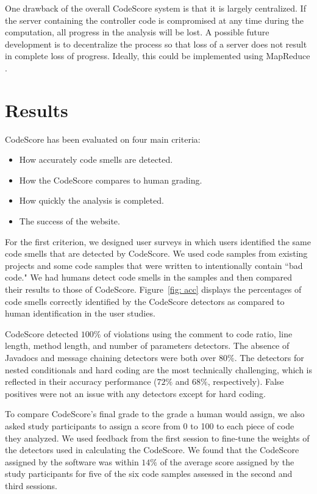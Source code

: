 \documentclass{sig-alternate}
\begin{document}
One drawback of the overall CodeScore system is that it is largely centralized.
If the server containing the controller code is compromised at any time during
the computation, all progress in the analysis will be lost. A possible future development
is to decentralize the process so that loss of a server does
not result in complete loss of progress. Ideally, this could be implemented
using MapReduce \cite{dean2008mapreduce}.

\section{Results}

CodeScore has been evaluated on four main criteria:

\begin{itemize}
	\item How accurately code smells are detected.
	\item How the CodeScore compares to human grading.
	\item How quickly the analysis is completed.
	\item The success of the website.
\end{itemize}

For the first criterion, we designed user surveys in which users identified
the same code smells that are detected by CodeScore. We used code samples from
existing projects and some code samples that were written to intentionally
contain ``bad code." We had humans detect code smells in the samples and then
compared their results to those of CodeScore. Figure~\ref{fig: acc} displays the percentages of code smells correctly identified by the CodeScore detectors as compared to human identification in the
user studies. 

CodeScore detected $100\%$ of violations using the comment to code ratio, line
length, method length, and number of parameters detectors. The absence of
Javadocs and message chaining detectors were both over $80\%$. The detectors
for nested conditionals and hard coding are the most technically challenging,
which is reflected in their accuracy performance ($72\%$ and $68\%$,
respectively). False positives were not an issue with any detectors except for
hard coding.

To compare CodeScore's final grade to the grade a human would assign, we also asked study
participants to assign a score from 0 to 100 to each piece of code they analyzed. We used
feedback from the first session to fine-tune the weights of the detectors used
in calculating the CodeScore. We found that the CodeScore assigned by the
software was within $14\%$ of the average score assigned by the study
participants for five of the six code samples assessed in the second and third
sessions.  
\end{document}
